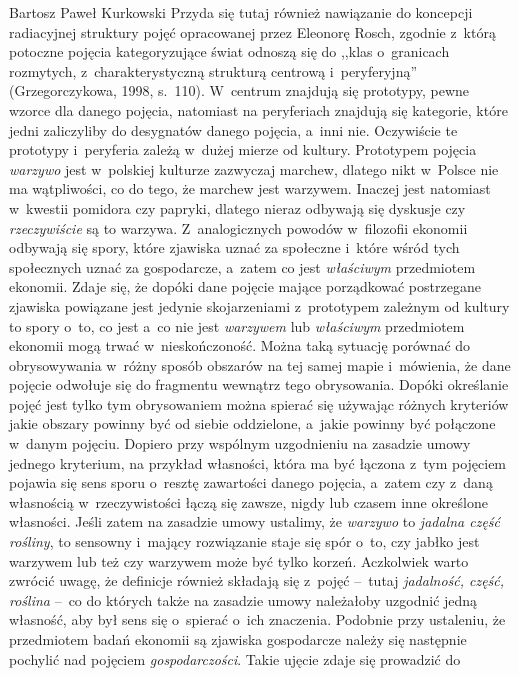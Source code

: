 \begin{artplenv}{Bartosz Paweł Kurkowski}
Przyda się tutaj również nawiązanie do koncepcji radiacyjnej struktury pojęć opracowanej przez Eleonorę Rosch,
zgodnie z~którą potoczne pojęcia kategoryzujące świat odnoszą się do ,,klas o~granicach
rozmytych, z~charakterystyczną strukturą
centrową i~peryferyjną'' \label{ref:RNDTzn5xoonRZ}(Grzegorczykowa, 1998, s.~110). W~centrum znajdują się prototypy,
pewne wzorce dla danego pojęcia, natomiast na peryferiach znajdują się kategorie, które jedni zaliczyliby do desygnatów
danego pojęcia, a~inni nie. Oczywiście te prototypy i~peryferia zależą w~dużej mierze od kultury. Prototypem pojęcia
\textit{warzywo} jest w~polskiej kulturze zazwyczaj marchew, dlatego nikt w~Polsce nie ma wątpliwości, co do tego, że
marchew jest warzywem. Inaczej jest natomiast w~kwestii pomidora czy papryki, dlatego nieraz odbywają się dyskusje czy
\textit{rzeczywiście} są to warzywa. Z~analogicznych powodów w~filozofii ekonomii odbywają się spory, które zjawiska
uznać za społeczne i~które wśród tych społecznych uznać za gospodarcze, a~zatem co jest \textit{właściwym }przedmiotem
ekonomii. Zdaje się, że dopóki dane pojęcie mające porządkować postrzegane zjawiska powiązane jest jedynie
skojarzeniami z~prototypem zależnym od kultury to spory o~to, co jest a~co nie jest \textit{warzywem} lub
\textit{właściwym }przedmiotem ekonomii mogą trwać w~nieskończoność. Można taką sytuację porównać do
obrysowywania w~różny sposób obszarów na tej samej mapie i~mówienia, że dane pojęcie odwołuje się do fragmentu wewnątrz tego
obrysowania. Dopóki określanie pojęć jest tylko tym obrysowaniem można spierać się używając różnych kryteriów jakie
obszary powinny być od siebie oddzielone, a~jakie powinny być połączone w~danym pojęciu. Dopiero przy wspólnym
uzgodnieniu na zasadzie umowy jednego kryterium, na przykład własności, która ma być łączona z~tym pojęciem pojawia się
sens sporu o~resztę zawartości danego pojęcia, a~zatem czy z~daną własnością w~rzeczywistości łączą się zawsze, nigdy
lub czasem inne określone własności. Jeśli zatem na zasadzie umowy ustalimy, że \textit{warzywo} to \textit{jadalna
część rośliny}, to sensowny i~mający rozwiązanie staje się spór o~to, czy jabłko jest warzywem lub też czy warzywem
może być tylko korzeń. Aczkolwiek warto zwrócić uwagę, że definicje również składają się z~pojęć --~tutaj
\textit{jadalność, część, roślina} --~co do których także na zasadzie umowy należałoby uzgodnić jedną własność, aby był
sens się o~spierać o~ich znaczenia. Podobnie przy ustaleniu, że przedmiotem badań ekonomii są zjawiska gospodarcze
należy się następnie pochylić nad pojęciem \textit{gospodarczości}. Takie ujęcie zdaje się prowadzić do

\end{artplenv}
